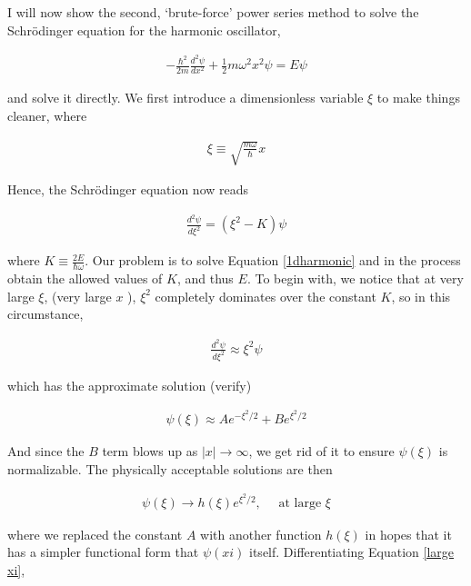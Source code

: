 I will now show the second, `brute-force' power series method to solve the
Schr\"odinger equation for the harmonic oscillator, 

\begin{align} \label{1Dharmonic}
  -\frac{\hbar^2}{2m} \frac{d^2 \psi}{d x^2} + \frac{1}{2}m\omega^2x^2\psi
  = E\psi
\end{align}\vspace{3px}

and solve it directly. We first introduce a dimensionless variable $\xi$ to
make things cleaner, where 

\begin{align} \label{xi}
\xi \equiv \sqrt{\frac{m\omega}{\hbar}}x
\end{align} \vspace{3px}

Hence, the Schr\"odinger equation now reads 

\begin{align} \label{1dharmonic}
  \frac{d^2 \psi}{d \xi^2} = (\xi^2 - K)\psi
\end{align}\vspace{3px}   

where $K \equiv \frac{2E}{\hbar\omega}$. Our problem is to solve Equation
\ref{1dharmonic} and in the process obtain the allowed values of $K$, and thus
$E$. To begin with, we notice that at very large $\xi$, (very large $x$ ),
$\xi^2$ completely dominates over the constant $K$, so in this circumstance, 

\begin{align} \label{approx_1}
  \frac{d^2 \psi}{d \xi^2} \approx \xi^2\psi
\end{align}

which has the approximate solution (verify) 

\begin{align} \label{}
  \psi(\xi) \approx Ae^{-\xi^2 / 2} + Be^{\xi^2 / 2}
\end{align}\vspace{3px}

And since the $B$ term blows up as $|x| \rightarrow \infty$, we get rid of it
to ensure $\psi(\xi)$ is normalizable. The physically acceptable solutions are
then 

\begin{align} \label{large xi}
  \psi(\xi) \rightarrow h(\xi)e^{\xi^2 / 2}, \quad \text{ at large $\xi$} 
\end{align}

where we replaced the constant $A$ with another function $h(\xi)$ in hopes that
it has a simpler functional form that $\psi(xi)$ itself. Differentiating
Equation \ref{large xi}, 



